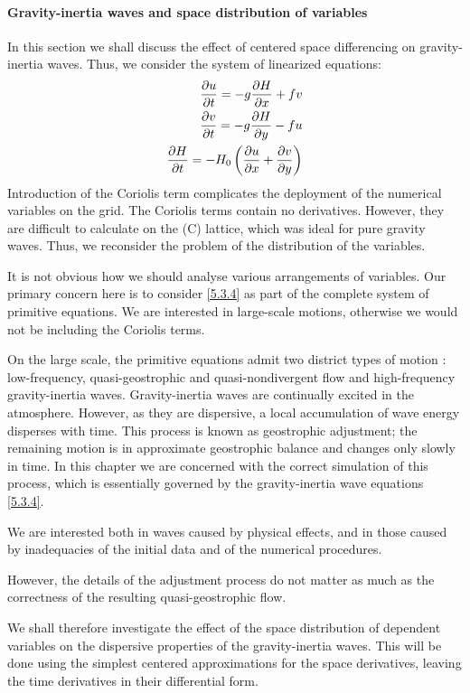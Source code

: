 \paragraph{Gravity-inertia waves and space distribution of variables}
In this section we shall discuss the effect of centered space differencing on gravity-inertia waves. Thus, we consider the system of linearized equations:
\begin{align}\label{5.3.4}
	\frac{\partial u}{\partial t}=-g\frac{\partial H}{\partial x}+fv        \\
	\frac{\partial v}{\partial t}=-g\frac{\partial H}{\partial y}-fu \notag \\
	\frac{\partial H}{\partial t}=-H_0\left(\frac{\partial u}{\partial x}+\frac{\partial v}{\partial y}\right)\notag
\end{align}
Introduction of the Coriolis term complicates the deployment of the numerical variables on the grid. The Coriolis terms contain no derivatives. However, they are difficult to calculate on the (C) lattice, which was ideal for pure gravity waves.
Thus, we reconsider the problem of the distribution of the variables.

It is not obvious how we should analyse various arrangements of variables. Our primary concern here is to consider \ref{5.3.4} as part of the complete system of primitive equations. We are interested in large-scale motions, otherwise we would not be including the Coriolis terms.

On the large scale, the primitive equations admit two district types of motion : low-frequency, quasi-geostrophic and quasi-nondivergent flow and high-frequency gravity-inertia waves. Gravity-inertia waves are continually excited in the atmosphere. However, as they are dispersive, a local accumulation of wave energy disperses with time. This process is known as geostrophic adjustment; the remaining motion is in approximate geostrophic balance and changes only slowly in time. In this chapter we are concerned with the correct simulation of this process, which is essentially governed by the gravity-inertia wave equations \ref{5.3.4}.

We are interested both in waves caused by physical effects, and in those caused by inadequacies of the initial data and of the numerical procedures.

However, the details of the adjustment process do not matter as much as the correctness of the resulting quasi-geostrophic flow.

We shall therefore investigate the effect of the space distribution of dependent variables on the dispersive properties of the gravity-inertia waves. This will be done using the simplest centered approximations for the space derivatives, leaving the time derivatives in their differential form.

